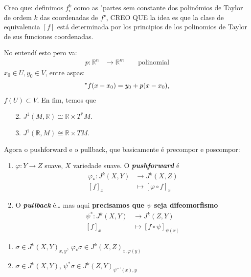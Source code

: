\begin{example}
Creo que: definimos \(f^k_i\) como as "partes sem constante dos polinómios de Taylor de ordem $k$ das coordenadas de $f$",
{\color{7}CREO QUE la idea es que la clase de equivalencia \([f]\)  está determinada por los principios de los polinomios de Taylor de sus funciones coordenadas.}

No entendí esto pero va:
\begin{align*}
	p: \mathbb{R}^n &\longrightarrow \mathbb{R}^m \qquad \text{polinomial}
\end{align*}
\(x_0 \in U, y_0 \in V\), entre aspas:
\["f(x-x_0) = y_0+p(x-x_0),\]
\(f(U) \subset V.\)
En fim, temos que
\begin{enumerate}
	\item[2.] \(J^1(M,\mathbb{R}) \cong \mathbb{R} \times T^*M\).
	\item[3.] \(J^1(\mathbb{R},M) \cong \mathbb{R} \times TM.\)
\end{enumerate}
\end{example}
Agora o pushforward e o pullback, que basicamente é precompor e poscompor:
\begin{defn}\leavevmode
\begin{enumerate}
\item \(\varphi:Y \to Z\) suave, \(X \) variedade suave. O \textit{\textbf{pushforward}} é
	\begin{align*}
		\varphi_*: J^k(X,Y) &\longrightarrow J^k(X,Z) \\
		[f]_x &\longmapsto [\varphi \circ f]_x
	\end{align*}
\item O  \textit{\textbf{pullback}} é… mas aqui \textbf{precisamos que  \(\psi\) seja difeomorfismo} 
	\begin{align*}
		\psi^*: J^k(X,Y) &\longrightarrow J^k(Z,Y) \\
		[f]_x &\longmapsto [f \circ \psi]_{\psi(x)}
	\end{align*}
\end{enumerate}
\end{defn}

\begin{remark}\leavevmode
\begin{enumerate}
\item \(\sigma \in J^k(X,Y)_{x,y}\), \(\varphi_* \sigma \in J^k(X,Z)_{x,\varphi(y)}\)
\item \(\sigma \in J^k(X,Y)\), \(\psi ^*\sigma \in J^k(Z,Y)_{\psi^{-1}(x),y}\)
\end{enumerate}
\end{remark}

